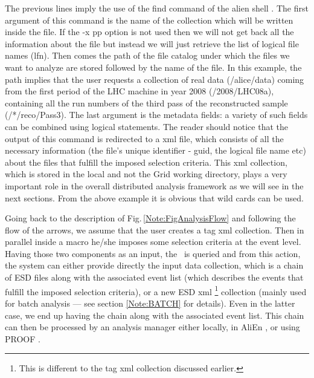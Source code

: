 The previous lines imply the use of the {\ttfamily find} command of the alien shell \cite{Note:RefAlienTutorial}. The first argument of this command is the name of the collection which will be written inside the file. If the {\ttfamily -x pp} option is not used then we will not get back all the information about the file but instead we will just retrieve the list of logical file names (lfn). Then comes the path of the file catalog under which the files we want to analyze are stored followed by the name of the file. In this example, the path implies that the user requests a collection of real data ({\ttfamily /alice/data}) coming from the first period of the LHC machine in year 2008 ({\ttfamily /2008/LHC08a}), containing all the run numbers of the third pass of the reconstructed sample ({\ttfamily /*/reco/Pass3}). The last argument is the metadata fields: a variety of such fields can be combined using logical statements. The reader should notice that the output of this command is redirected to a xml file, which consists of all the necessary information (the file's unique identifier - guid, the logical file name etc) about the files that fulfill the imposed selection criteria. This xml collection, which is stored in the local and not the Grid working directory,  plays a very important role in the overall distributed analysis framework as we will see in the next sections. From the above example it is obvious that wild cards can be used.

Going back to the description of Fig.\,\ref{Note:FigAnalysisFlow} and following the flow of the arrows, we assume that the user creates a tag xml collection. Then in parallel inside a macro he/she imposes some selection criteria at the event level. Having those two components as an input, the \tag\ is queried and from this action, the system can either provide directly the input data collection, which is a chain of ESD files along with the associated event list (which describes the events that fulfill the imposed selection criteria), or a new ESD xml \footnote{This is different to the tag xml collection discussed earlier.} collection (mainly used for batch analysis --- see section \ref{Note:BATCH} for details). Even in the latter case, we end up having the chain along with the associated event list. This chain can then be processed by an analysis manager \cite{Note:RefAnalysisFramework} either locally, in AliEn \cite{Note:RefALIEN}, or using PROOF \cite{Note:RefPROOF}.

